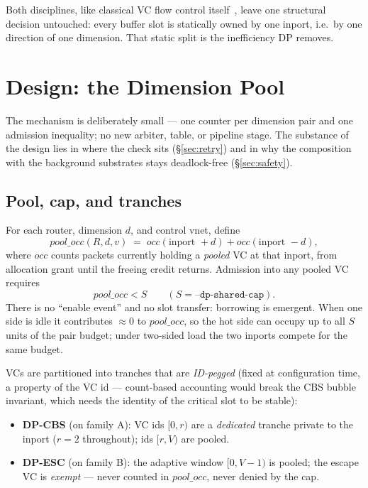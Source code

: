 \documentclass[10pt]{article}
\newcommand{\poolocc}{\mathit{pool\_occ}}
\begin{document}
Both disciplines, like classical VC flow control
itself~\cite{dally1992}, leave one structural decision untouched: every
buffer slot is statically owned by one inport, i.e.\ by one direction of
one dimension. That static split is the inefficiency DP removes.

\section{Design: the Dimension Pool}
\label{sec:design}

The mechanism is deliberately small --- one counter per dimension pair
and one admission inequality; no new arbiter, table, or pipeline stage.
The substance of the design lies in where the check sits
(\S\ref{sec:retry}) and in why the composition with the background
substrates stays deadlock-free (\S\ref{sec:safety}).

\subsection{Pool, cap, and tranches}

For each router, dimension $d$, and control vnet, define
\begin{equation}
  \poolocc(R, d, v) \;=\; \mathit{occ}(\text{inport } {+}d) +
  \mathit{occ}(\text{inport } {-}d),
\end{equation}
where $\mathit{occ}$ counts packets currently holding a \emph{pooled} VC
at that inport, from allocation grant until the freeing credit returns.
Admission into any pooled VC requires
\begin{equation}
  \poolocc < S \qquad (S = \texttt{--dp-shared-cap}).
\end{equation}
There is no ``enable event'' and no slot transfer: borrowing is emergent.
When one side is idle it contributes $\approx 0$ to $\poolocc$, so the hot
side can occupy up to all $S$ units of the pair budget; under two-sided
load the two inports compete for the same budget.

VCs are partitioned into tranches that are \emph{ID-pegged} (fixed at
configuration time, a property of the VC id --- count-based accounting
would break the CBS bubble invariant, which needs the identity of the
critical slot to be stable):

\begin{itemize}
  \item \textbf{DP-CBS} (on family A): VC ids $[0, r)$ are a
    \emph{dedicated} tranche private to the inport ($r{=}2$ throughout);
    ids $[r, V)$ are pooled.
  \item \textbf{DP-ESC} (on family B): the adaptive window $[0, V-1)$ is
    pooled; the escape VC is \emph{exempt} --- never counted in
    $\poolocc$, never denied by the cap.
\end{itemize}
\end{document}
